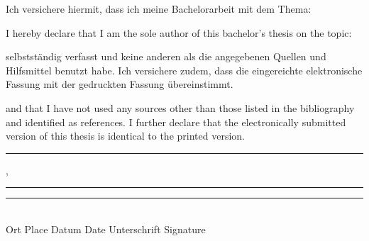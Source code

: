 \vfill
\begin{paracol}{2}
    \begin{leftcolumn}
        Ich versichere hiermit, dass ich meine Bachelorarbeit mit dem Thema:
    \end{leftcolumn}
    
    \begin{rightcolumn}
        \color{gray}
        I hereby declare that I am the sole author of this bachelor's thesis on the topic:
    \end{rightcolumn}
\end{paracol}

\begin{center}
    \vspace{1cm}
    \textit{\@title}
    \vspace{1cm}
\end{center}

\begin{paracol}{2}
    \begin{leftcolumn}
        selbstständig verfasst und keine anderen als die angegebenen Quellen und Hilfsmittel benutzt habe. Ich versichere zudem, dass die eingereichte elektronische Fassung mit der gedruckten Fassung \"ubereinstimmt.
    \end{leftcolumn}
    
    \begin{rightcolumn}
        \color{gray}
        and that I have not used any sources other than those listed in the bibliography and identified as references. I further declare that the electronically submitted version of this thesis is identical to the printed version.
    \end{rightcolumn}
    
\end{paracol}

\vfill

\rule{3,5cm}{0.4pt}, \rule{3,5cm}{0.4pt} \hspace{0.38cm} \rule{7cm}{0.4pt}\\
Ort {\color{gray}Place}
\hspace{1.8cm}
Datum {\color{gray}Date}
\hspace{1.6cm}
Unterschrift {\color{gray}Signature}



\vfill